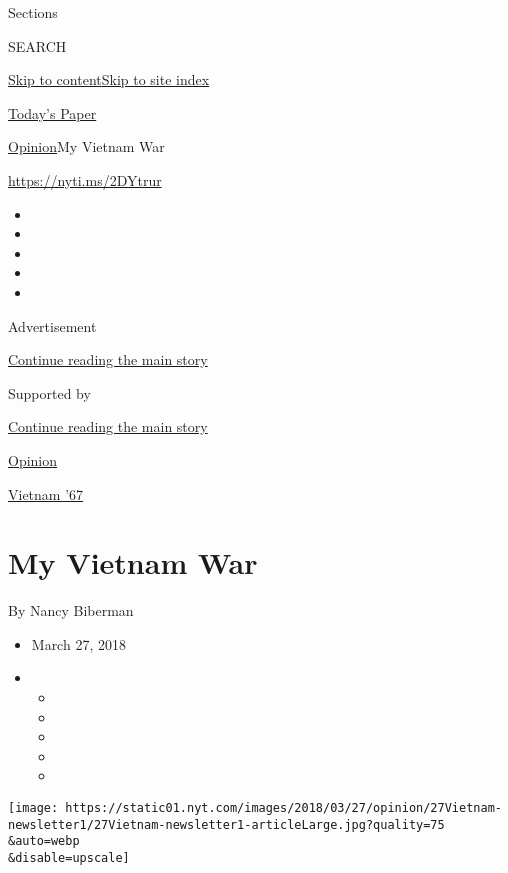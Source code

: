 Sections

SEARCH

\protect\hyperlink{site-content}{Skip to
content}\protect\hyperlink{site-index}{Skip to site index}

\href{https://myaccount.nytimes.com/auth/login?response_type=cookie\&client_id=vi}{}

\href{https://www.nytimes.com/section/todayspaper}{Today's Paper}

\href{/section/opinion}{Opinion}\textbar{}My Vietnam War

\href{https://nyti.ms/2DYtrur}{https://nyti.ms/2DYtrur}

\begin{itemize}
\item
\item
\item
\item
\item
\end{itemize}

Advertisement

\protect\hyperlink{after-top}{Continue reading the main story}

Supported by

\protect\hyperlink{after-sponsor}{Continue reading the main story}

\href{/section/opinion}{Opinion}

\href{/column/vietnam-67}{Vietnam '67}

\hypertarget{my-vietnam-war}{%
\section{My Vietnam War}\label{my-vietnam-war}}

By Nancy Biberman

\begin{itemize}
\item
  March 27, 2018
\item
  \begin{itemize}
  \item
  \item
  \item
  \item
  \item
  \end{itemize}
\end{itemize}

\texttt{[image: https://static01.nyt.com/images/2018/03/27/opinion/27Vietnam-newsletter1/27Vietnam-newsletter1-articleLarge.jpg?quality=75\\\&auto=webp\\\&disable=upscale]}

